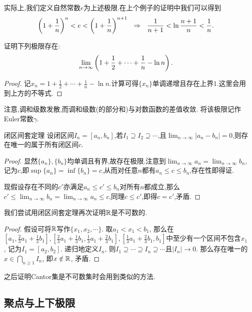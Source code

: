 实际上,我们定义自然常数$e$为上述极限.在上个例子的证明中我们可以得到$$\left( 1+\frac{1}{n} \right)^n < e < \left( 1+\frac{1}{n} \right)^{n+1} ~~\Rightarrow ~~ \frac{1}{n+1} < \ln \frac{n+1}{n} < \frac{1}{n}.$$

\begin{example}
	证明下列极限存在:$$\lim_{n\to \infty} \left(  1+\frac{1}{2}+\cdots + \frac{1}{n}-\ln n  \right).$$
\end{example}
\begin{proof}
	记$x_n=1+\frac{1}{2}+\cdots + \frac{1}{n}-\ln n$.计算可得$\{ x_n \}$单调递增且存在上界$1$.这里会用到上方的不等式.
\end{proof}

注意,调和级数发散,而调和级数(的部分和)与对数函数的差值收敛. 将该极限记作Euler常数$\gamma$.

\begin{theorem}{闭区间套定理}
	设闭区间$I_n=[a_n,b_n]$,若$I_1 \supseteq I_2 \supseteq \cdots $,且$\lim_{n\to \infty} |a_n-b_n|=0$,则存在唯一的属于所有闭区间$c$. 
\end{theorem}
\begin{proof}
	显然$\{ a_n \},\{ b_n \}$均单调且有界,故存在极限.注意到$\lim_{n\to \infty} a_n = \lim_{n\to \infty} b_n$,记为$c$,即$\sup \{ a_n \} = \inf \{ b_n \} = c$,从而对任意$n$都有$a_n \leq c \leq b_n$,存在性即得证.
	
	现假设存在不同的$c'$亦满足$a_n \leq c' \leq b_n$对所有$n$都成立,那么$c' \leq \lim_{n\to \infty} b_n = \lim_{n\to \infty} a_n \leq c$,同理$c \leq c'$,即得$c=c'$,矛盾.
\end{proof}

我们尝试用闭区间套定理再次证明$\mathbb{R}$是不可数的. 

\begin{proof}
	假设可将$\mathbb{R}$写作$\{ x_1,x_2,\cdots \}$. 取$a_1<x_1<b_1$, 那么在$[a_1, \frac{2}{3}a_1+\frac{1}{3}b_1], [\frac{2}{3}a_1+\frac{1}{3}b_1, \frac{1}{3}a_1+\frac{2}{3}b_1], [\frac{1}{3}a_1+\frac{2}{3}b_1 , b_1]$中至少有一个区间不包含$x_1$, 记为$I_1=[a_2,b_2]$. 递归地定义$I_n$, 则$I_1 \supseteq \cdots \supseteq I_n \supseteq \cdots$且$|I_n| \to 0$. 那么存在唯一的$x \in \bigcap_{n \geq 1}I_n$, 即$x \notin \mathbb{R}$, 矛盾. 
\end{proof}
\begin{remark}
	之后证明Cantor集是不可数集时会用到类似的方法. 
\end{remark}

\subsection{聚点与上下极限}

